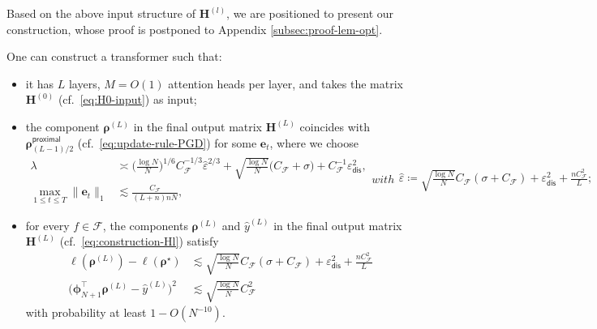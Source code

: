 \documentclass[english]{article}
\begin{document}
Based on the above input structure of ${\bm H}^{(l)}$, we are positioned to present our construction, whose proof is postponed to Appendix \ref{subsec:proof-lem-opt}.
%
\begin{lemma}\label{lem:opt}
One can construct a transformer such that: 
\begin{itemize}
    \item[i)] it has $L$ layers, $M=O(1)$ attention heads per layer, and takes the matrix ${\bm H}^{(0)}$ (cf.~\eqref{eq:H0-input}) as input;
\item[ii)] the component ${\bm \rho}^{(L)}$ in the final output matrix ${\bm H}^{(L)}$ coincides with ${\bm \rho}_{(L-1)/2}^{\mathsf{proximal}}$ (cf.~\eqref{eq:update-rule-PGD}) for some $\bm{e}_t$, where we choose  
%
\begin{subequations}
\begin{align}
\lambda &\asymp \Big(\frac{\log N}{N}\Big)^{1/6} C_{\mathcal{F}}^{-1/3}\widehat{\varepsilon}^{2/3} + \sqrt{\frac{\log N}{N}}\Big(C_{\mathcal{F}} + \sigma\Big) + C_{\mathcal{F}}^{-1}\varepsilon_{\mathsf{dis}}^2,\label{eq:lambda}\\
\max_{1\le t\le T}\|{\bm e}_t\|_1&\lesssim \frac{C_{\mathcal{F}}}{(L+n)nN},
\end{align}
with 
\begin{align}\label{eq:def-hat-eps}
\widehat{\varepsilon} \coloneqq  \sqrt{\frac{\log N}{N}}C_{\mathcal{F}}(\sigma + C_{\mathcal{F}})
+\varepsilon_{\mathsf{dis}}^2 + \frac{nC_{\mathcal{F}}^2}{L};
\end{align}
\end{subequations}
\item[iii)]  for every $f\in\mathcal{F}$, the components ${\bm \rho}^{(L)}$ and $\widehat{y}^{(L)}$ in the final output matrix ${\bm H}^{(L)}$ (cf.~\eqref{eq:construction-Hl}) satisfy
\begin{subequations}
\begin{align}
\ell({\bm \rho}^{(L)}) - \ell({\bm \rho}^{\star}) &\lesssim \sqrt{\frac{\log N}{N}}C_{\mathcal{F}}(\sigma + C_{\mathcal{F}})
+\varepsilon_{\mathsf{dis}}^2 + \frac{nC_{\mathcal{F}}^2}{L}\label{eq:lem-opt}\\
\big({\bm \phi}_{N+1}^{\top}{\bm \rho}^{(L)} - \widehat{y}^{(L)}\big)^2&\lesssim  \sqrt{\frac{\log N}{N}}C_{\mathcal{F}}^2\label{eq:approx-haty}
\end{align}
\end{subequations}
with probability at least $1-O(N^{-10})$. 
\end{itemize}
\end{lemma}
\end{document}
